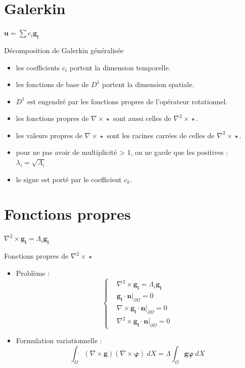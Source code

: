 \documentclass{beamer}
\newcommand{\rot}{{\nabla\times}}
\newcommand{\rott}{{\nabla^2\times}}
\newcommand{\restr}{{\big\rvert_{\partial\Omega}}}
\begin{document}
\section{Galerkin}
\begin{frame}{$\mathbf{u}=\sum c_i\mathbf{g_i}$}
\begin{block}{Décomposition de Galerkin généralisée}
\begin{itemize}
\item les coefficients $c_i$ portent la dimension temporelle.
\item les fonctions de base de $D^1$ portent la dimension spatiale.
\item $D^1$ est engendré par les fonctions propres de l'opérateur rotationnel.
\item les fonctions propres de $\rot\star$ sont aussi celles de $\rott\star$.
\item les valeurs propres de $\rot\star$ sont les racines carrées de celles de $\rott\star$.
\item pour ne pas avoir de multiplicité > 1, on ne garde que les positives : $\lambda_i=\sqrt{\Lambda_i}$
\item le signe est porté par le coefficient $c_k$.
\end{itemize}
\end{block}
\end{frame}

\section{Fonctions propres}
\begin{frame}{$\rott  \mathbf{g_i} = \Lambda_i \mathbf{g_i}$}
\begin{block}{Fonctions propres de $\rott\star$}
\begin{itemize}
\item Problème :
\[\left\{\begin{aligned}
&\rott  \mathbf{g_i} = \Lambda_i \mathbf{g_i}\\
&\mathbf{g_i}\cdot \mathbf{n}\restr = 0\\
&\rot \mathbf{g_i}\cdot \mathbf{n}\restr = 0\\
&\rott  \mathbf{g_i}\cdot \mathbf{n}\restr = 0
\end{aligned}\right.\]
\item Formulation variationnelle :
\[ \int_\Omega (\rot \mathbf{g})(\rot\bm{\varphi})\ dX = \Lambda\int_\Omega \mathbf{g}\bm{\varphi}\ dX \]
\end{itemize}
\end{block}
\end{frame}
\end{document}
